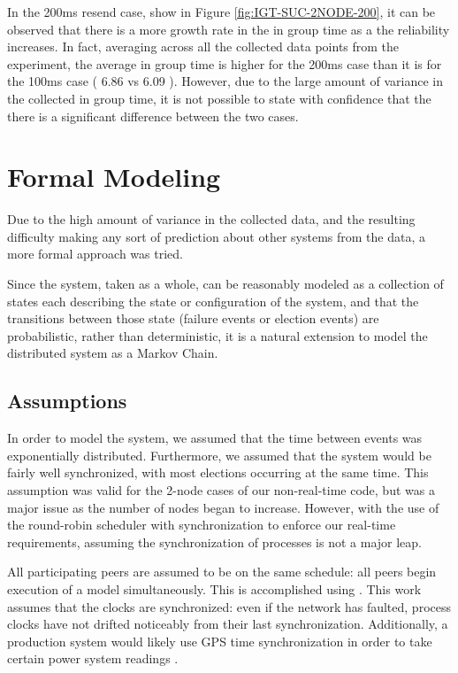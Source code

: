 In the 200ms resend case, show in Figure \ref{fig:IGT-SUC-2NODE-200}, it can be 
observed that there is a more growth rate in the in group time as a the
reliability increases. In fact, averaging across all the collected data points
from the experiment, the average in group time is higher for the 200ms case
than it is for the 100ms case ( 6.86 vs 6.09 ). However, due to the large amount
of variance in the collected in group time, it is not possible to state with
confidence that the there is a significant difference between the two cases.

\section{Formal Modeling}

Due to the high amount of variance in the collected data, and the resulting
difficulty making any sort of prediction about other systems from the data, a
more formal approach was tried.

Since the system, taken as a whole, can be reasonably modeled as a collection of 
states each describing the state or configuration of the system, and that the
transitions between those state (failure events or election events) are probabilistic,
rather than deterministic, it is a natural extension to model the distributed
system as a Markov Chain.

\subsection{Assumptions}
In order to model the system, we assumed that the time between events was 
exponentially distributed. Furthermore, we assumed that the system would be
fairly well synchronized, with most elections occurring at the same time. This
assumption was valid for the 2-node cases of our non-real-time code, but was
a major issue as the number of nodes began to increase. However, with
the use of the round-robin scheduler with synchronization to enforce our
real-time requirements, assuming the synchronization of processes is not a
major leap.

All participating peers are assumed to be on the same schedule: all
peers begin execution of a model simultaneously. This is accomplished using \cite{DCS}.
This work assumes that the clocks are synchronized: even if the network has faulted,
process clocks have not drifted noticeably from their last synchronization. Additionally,
a production system would likely use GPS time synchronization in order to take
certain power system readings \cite{PHASORREADINGS}.

